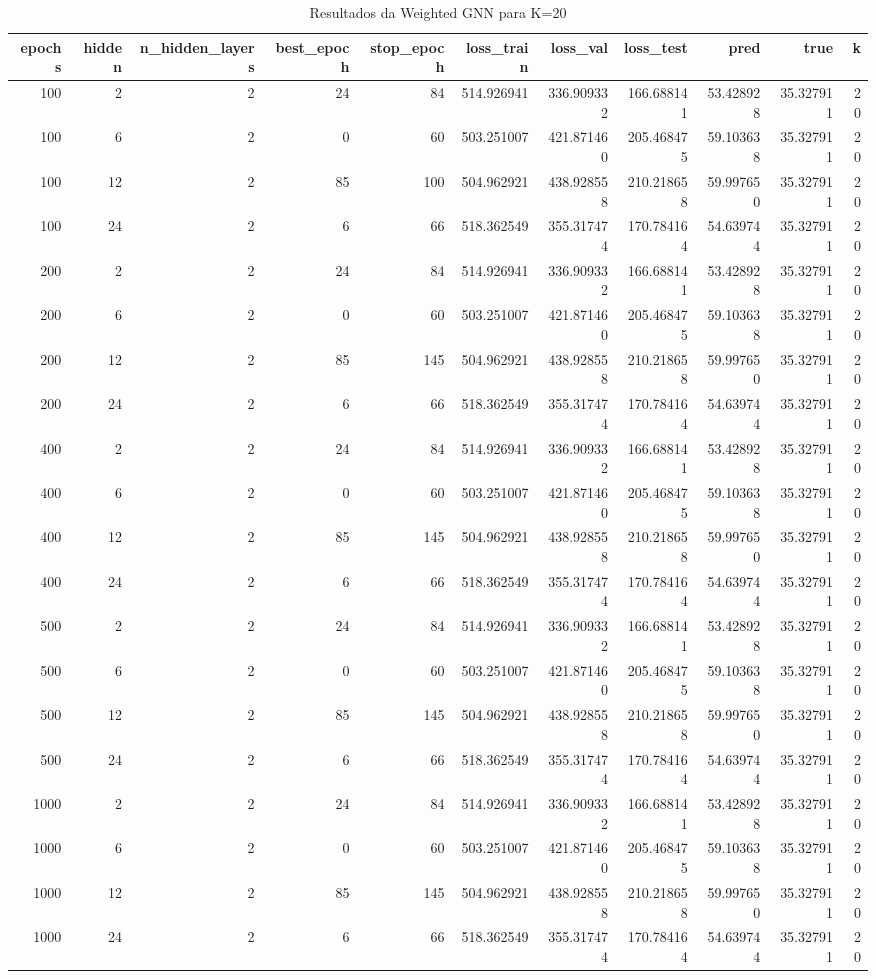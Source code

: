 \begin{table}
\caption{Resultados da Weighted GNN para K=20}
\label{tab:weighted_gnn_results_k20}
\begin{tabular}{rrrrrrrrrrr}
\toprule
epochs & hidden & n\_hidden\_layers & best\_epoch & stop\_epoch & loss\_train & loss\_val & loss\_test & pred & true & k \\
\midrule
100 & 2 & 2 & 24 & 84 & 514.926941 & 336.909332 & 166.688141 & 53.428928 & 35.327911 & 20 \\
100 & 6 & 2 & 0 & 60 & 503.251007 & 421.871460 & 205.468475 & 59.103638 & 35.327911 & 20 \\
100 & 12 & 2 & 85 & 100 & 504.962921 & 438.928558 & 210.218658 & 59.997650 & 35.327911 & 20 \\
100 & 24 & 2 & 6 & 66 & 518.362549 & 355.317474 & 170.784164 & 54.639744 & 35.327911 & 20 \\
200 & 2 & 2 & 24 & 84 & 514.926941 & 336.909332 & 166.688141 & 53.428928 & 35.327911 & 20 \\
200 & 6 & 2 & 0 & 60 & 503.251007 & 421.871460 & 205.468475 & 59.103638 & 35.327911 & 20 \\
200 & 12 & 2 & 85 & 145 & 504.962921 & 438.928558 & 210.218658 & 59.997650 & 35.327911 & 20 \\
200 & 24 & 2 & 6 & 66 & 518.362549 & 355.317474 & 170.784164 & 54.639744 & 35.327911 & 20 \\
400 & 2 & 2 & 24 & 84 & 514.926941 & 336.909332 & 166.688141 & 53.428928 & 35.327911 & 20 \\
400 & 6 & 2 & 0 & 60 & 503.251007 & 421.871460 & 205.468475 & 59.103638 & 35.327911 & 20 \\
400 & 12 & 2 & 85 & 145 & 504.962921 & 438.928558 & 210.218658 & 59.997650 & 35.327911 & 20 \\
400 & 24 & 2 & 6 & 66 & 518.362549 & 355.317474 & 170.784164 & 54.639744 & 35.327911 & 20 \\
500 & 2 & 2 & 24 & 84 & 514.926941 & 336.909332 & 166.688141 & 53.428928 & 35.327911 & 20 \\
500 & 6 & 2 & 0 & 60 & 503.251007 & 421.871460 & 205.468475 & 59.103638 & 35.327911 & 20 \\
500 & 12 & 2 & 85 & 145 & 504.962921 & 438.928558 & 210.218658 & 59.997650 & 35.327911 & 20 \\
500 & 24 & 2 & 6 & 66 & 518.362549 & 355.317474 & 170.784164 & 54.639744 & 35.327911 & 20 \\
1000 & 2 & 2 & 24 & 84 & 514.926941 & 336.909332 & 166.688141 & 53.428928 & 35.327911 & 20 \\
1000 & 6 & 2 & 0 & 60 & 503.251007 & 421.871460 & 205.468475 & 59.103638 & 35.327911 & 20 \\
1000 & 12 & 2 & 85 & 145 & 504.962921 & 438.928558 & 210.218658 & 59.997650 & 35.327911 & 20 \\
1000 & 24 & 2 & 6 & 66 & 518.362549 & 355.317474 & 170.784164 & 54.639744 & 35.327911 & 20 \\
\bottomrule
\end{tabular}
\end{table}
